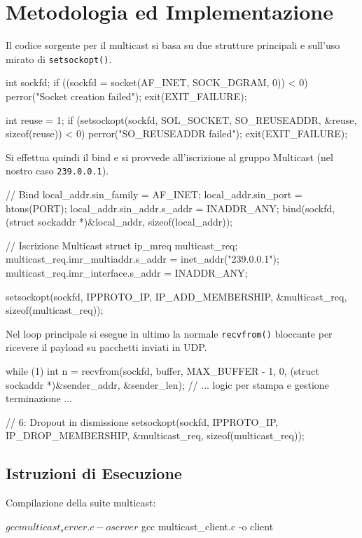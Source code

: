 \documentclass[a4paper,12pt]{article}
\begin{document}
\section{Metodologia ed Implementazione}

Il codice sorgente per il multicast si basa su due strutture principali e sull'uso mirato di \texttt{setsockopt()}.

\begin{ccode}
int sockfd;
if ((sockfd = socket(AF_INET, SOCK_DGRAM, 0)) < 0) {
    perror("Socket creation failed");
    exit(EXIT_FAILURE);
}

int reuse = 1;
if (setsockopt(sockfd, SOL_SOCKET, SO_REUSEADDR, &reuse, sizeof(reuse)) < 0) {
    perror("SO_REUSEADDR failed");
    exit(EXIT_FAILURE);
}
\end{ccode}

Si effettua quindi il bind e si provvede all'iscrizione al gruppo Multicast (nel nostro caso \texttt{239.0.0.1}).
\begin{ccode}
// Bind
local_addr.sin_family = AF_INET;
local_addr.sin_port = htons(PORT);
local_addr.sin_addr.s_addr = INADDR_ANY;
bind(sockfd, (struct sockaddr *)&local_addr, sizeof(local_addr));

// Iscrizione Multicast
struct ip_mreq multicast_req;
multicast_req.imr_multiaddr.s_addr = inet_addr("239.0.0.1");
multicast_req.imr_interface.s_addr = INADDR_ANY;

setsockopt(sockfd, IPPROTO_IP, IP_ADD_MEMBERSHIP, &multicast_req, sizeof(multicast_req));
\end{ccode}

\newpage
Nel loop principale si esegue in ultimo la normale \texttt{recvfrom()} bloccante per ricevere il payload su pacchetti inviati in UDP.
\begin{ccode}
while (1) {
    int n = recvfrom(sockfd, buffer, MAX_BUFFER - 1, 0, 
                     (struct sockaddr *)&sender_addr, &sender_len);
    // ... logic per stampa e gestione terminazione ...
}

// 6: Dropout in dismissione
setsockopt(sockfd, IPPROTO_IP, IP_DROP_MEMBERSHIP, &multicast_req, sizeof(multicast_req));
\end{ccode}


\subsection{Istruzioni di Esecuzione}
Compilazione della suite multicast:
\begin{terminal}
$ gcc multicast_server.c -o server
$ gcc multicast_client.c -o client
\end{terminal}
\end{document}
